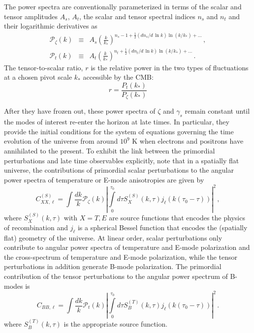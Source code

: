 The power spectra are conventionally parameterized in terms of the scalar and tensor amplitudes $A_s$, $A_t$, the scalar and tensor spectral indices $n_s$ and $n_t$ and their logarithmic derivatives as
\begin{eqnarray}
\mathcal{P}_{\zeta}(k)&\equiv& A_s\left(\frac{k}{k_*}\right)^{n_s-1+\frac{1}{2}(dn_s/d\,\ln k)\ln(k/k_*)+\dots}\,,\nonumber\\
\mathcal{P}_{t}(k)&\equiv& A_t \left(\frac{k}{k_*}\right)^{n_t+\frac{1}{2}(dn_t/d\,\ln k)\ln(k/k_*)+\dots}\,.
\end{eqnarray}
The tensor-to-scalar ratio, $r$ is the relative power in the two types of fluctuations at a chosen pivot scale $k_*$ accessible by the CMB:
\begin{equation}
r=\frac{P_t(k_*)}{P_{\zeta}(k_*)}
\end{equation}

After they have frozen out, these power spectra of $\zeta$ and $\gamma_s$ remain constant until the modes of interest re-enter the horizon at late times. In particular, they provide the initial conditions for the system of equations governing the time evolution of the universe from around $10^9$ K when electrons and positrons have annihilated to the present. To exhibit the link between the primordial perturbations and late time observables explicitly, note that in a spatially flat universe, the contributions of primordial scalar perturbations to the angular power spectra of temperature or E-mode anisotropies are given by
\begin{equation}
C^{(S)}_{XX,\ell}=\int \frac{dk}{k}\mathcal{P}_\zeta(k)\left|\int\limits_0^{\tau_0} d\tau S_X^{(S)}(k,\tau)j_\ell(k(\tau_0-\tau))\right|^2\,,
\end{equation}
where $S_X^{(S)}(k,\tau)$ with $X=T,E$ are source functions that encodes the physics of recombination and $j_\ell$ is a spherical Bessel function that encodes the (spatially flat) geometry of the universe.
At linear order, scalar perturbations only contribute to angular power spectra of temperature and E-mode polarization and the cross-spectrum of temperature and E-mode polarization, while the tensor perturbations in addition generate B-mode polarization. The primordial contribution of the tensor perturbations to the angular power spectrum of B-modes is 
\begin{equation}
C_{BB,\ell}=\int \frac{dk}{k}\mathcal{P}_t(k)\left|\int\limits_0^{\tau_0} d\tau S_B^{(T)}(k,\tau)j_\ell(k(\tau_0-\tau))\right|^2\,.
\end{equation}
where $S_B^{(T)}(k,\tau)$ is the appropriate source function. 


